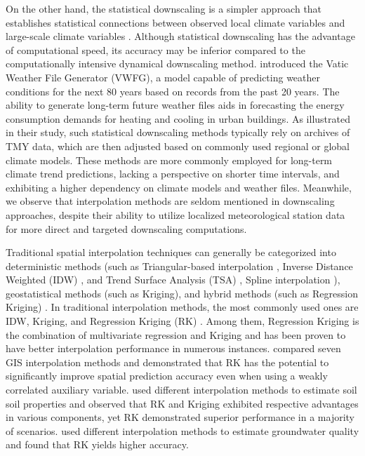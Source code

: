 \documentclass[a4paper,fleqn]{cas-sc}
\begin{document}
On the other hand, the statistical downscaling is a simpler approach that establishes statistical connections between observed local climate variables and large-scale climate variables \cite{bamdad2021future}. Although statistical downscaling has the advantage of computational speed, its accuracy may be inferior compared to the computationally intensive dynamical downscaling method. \cite{aliabadi2023vatic} introduced the Vatic Weather File Generator (VWFG), a model capable of predicting weather conditions for the next 80 years based on records from the past 20 years. The ability to generate long-term future weather files aids in forecasting the energy consumption demands for heating and cooling in urban buildings. As illustrated in their study, such statistical downscaling methods typically rely on archives of TMY data, which are then adjusted based on commonly used regional or global climate models. These methods are more commonly employed for long-term climate trend predictions, lacking a perspective on shorter time intervals, and exhibiting a higher dependency on climate models and weather files. Meanwhile, we observe that interpolation methods are seldom mentioned in downscaling approaches, despite their ability to utilize localized meteorological station data for more direct and targeted downscaling computations.

Traditional spatial interpolation techniques can generally be categorized into deterministic methods (such as Triangular-based interpolation \citep{watson1984triangle}, Inverse Distance Weighted (IDW) \citep{bartier1996multivariate}, and Trend Surface Analysis (TSA) \citep{agterberg1984trend}, Spline interpolation \citep{schoenberg1973cardinal}), geostatistical methods (such as Kriging), and hybrid methods (such as Regression Kriging) \citep{granville2023selection}. In traditional interpolation methods, the most commonly used ones are IDW, Kriging, and Regression Kriging (RK) \citep{li2011review}. Among them, Regression Kriging is the combination of multivariate regression and Kriging and has been proven to have better interpolation performance in numerous instances. \cite{meng2013assessment} compared seven GIS interpolation methods and demonstrated that RK has the potential to significantly improve spatial prediction accuracy even when using a weakly correlated auxiliary variable. \cite{gia2019application} used different interpolation methods to estimate soil soil properties and observed that RK and Kriging exhibited respective advantages in various components, yet RK demonstrated superior performance in a majority of scenarios. \cite{azawi2021review} used different interpolation methods to estimate groundwater quality and found that RK yields higher accuracy.
\end{document}
